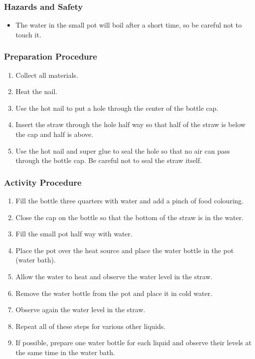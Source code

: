 \subsubsection*{Hazards and Safety}
\begin{itemize}
\item{The water in the small pot will boil after a short time, so be careful not to touch it.} 
\end{itemize}

\subsubsection*{Preparation Procedure}
\begin{enumerate}
\item{Collect all materials.} 
\item{Heat the nail.} 
\item{Use the hot nail to put a hole through the center of the bottle cap.} 
\item{Insert the straw through the hole half way so that half of the straw is below the cap and half is above.} 
\item{Use the hot nail and super glue to seal the hole so that no air can pass through the bottle cap. Be careful not to seal the straw itself.} 
\end{enumerate}

\subsubsection*{Activity Procedure}
\begin{enumerate}
\item{Fill the bottle three quarters with water and add a pinch of food colouring.} 
\item{Close the cap on the bottle so that the bottom of the straw is in the water.} 
\item{Fill the small pot half way with water.} 
\item{Place the pot over the heat source and place the water bottle in the pot (water bath).} 
\item{Allow the water to heat and observe the water level in the straw.} 
\item{Remove the water bottle from the pot and place it in cold water.} 
\item{Observe again the water level in the straw.} 
\item{Repeat all of these steps for various other liquids.} 
\item{If possible, prepare one water bottle for each liquid and observe their levels at the same time in the water bath.} 
\end{enumerate}


